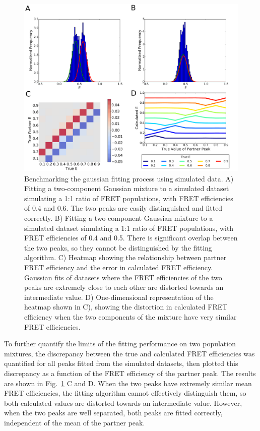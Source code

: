 \begin{figure}[!ht]
   \begin{center}
      \includegraphics*[clip=true, width=6in]{pyFRET/benchmarking.pdf}
      \caption{Benchmarking the gaussian fitting process using simulated data. A) Fitting a two-component Gaussian mixture to a simulated dataset simulating a 1:1 ratio of FRET populations, with FRET efficiencies of 0.4 and 0.6. The two peaks are easily distinguished and fitted correctly. B) Fitting a two-component Gaussian mixture to a simulated dataset simulating a 1:1 ratio of FRET populations, with FRET efficiencies of 0.4 and 0.5. There is significant overlap between the two peaks, so they cannot be distinguished by the fitting algorithm. C) Heatmap showing the relationship between partner FRET efficiency and the error in calculated FRET efficiency. Gaussian fits of datasets where the FRET efficiencies of the two peaks are extremely close to each other are distorted towards an intermediate value. D) One-dimensional representation of the heatmap shown in C), showing the distortion in calculated FRET efficiency when the two components of the mixture have very similar FRET efficiencies.}
      \label{fig:fig_benchmarking}
   \end{center}
\end{figure}

To further quantify the limits of the fitting performance on two population mixtures, the discrepancy between the true and calculated FRET efficiencies was quantified for all peaks fitted from the simulated datasets, then plotted this discrepancy as a function of the FRET efficiency of the partner peak. The results are shown in Fig.~\ref{fig:fig_benchmarking} C and D. When the two peaks have extremely similar mean FRET efficiencies, the fitting algorithm cannot effectively distinguish them, so both calculated values are distorted towards an intermediate value. However, when the two peaks are well separated, both peaks are fitted correctly, independent of the mean of the partner peak.

